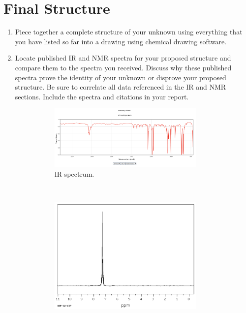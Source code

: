 \documentclass[titlepage]{article}
\begin{document}
\section*{Final Structure}
\begin{enumerate}
    \item Piece together a complete structure of your unknown using everything that you have listed so far into a drawing using chemical drawing software.
    \begin{center}
    \end{center}
    \item Locate published IR and  NMR spectra for your proposed structure and compare them to the spectra you received. Discuss why these published spectra prove the identity of your unknown or disprove your proposed structure. Be sure to correlate all data referenced in the IR and  NMR sections. Include the spectra and citations in your report.
    \begin{figure}[h!]
        \centering
        \begin{subfigure}[b]{0.8\linewidth}
            \centering
            \includegraphics[width=0.9\textwidth]{../../ExtFiles/Chlorobenzene-IR.png}
            \caption{IR spectrum.}
            \label{fig:spectraa}
        \end{subfigure}\\[1em]
        \begin{subfigure}[b]{0.4\linewidth}
            \centering
            \includegraphics[width=0.9\textwidth]{../../ExtFiles/Chlorobenzene-1HNMR.png}

\end{subfigure}
\end{figure}
\end{enumerate}
\end{document}
